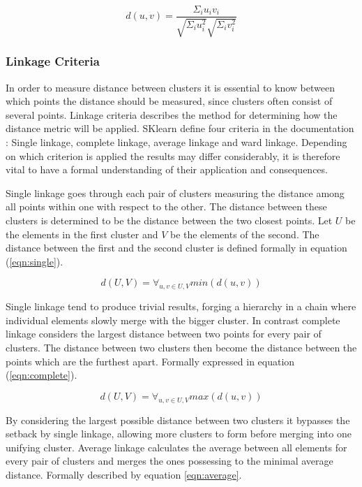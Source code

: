 \begin{equation}
\label{eqn:cosine}
d(u, v) = \frac{\Sigma_i u_iv_i}{\sqrt{\Sigma_i u_i^2}\sqrt{\Sigma_i v_i^2}}
\end{equation}

\subsubsection{Linkage Criteria}
In order to measure distance between clusters it is essential to know between which points the distance should be measured, since clusters often consist of several points. Linkage criteria describes the method for determining how the distance metric will be applied. SKlearn define four criteria in the documentation \cite{scikit}: Single linkage, complete linkage, average linkage and ward linkage. Depending on which criterion is applied the results may differ considerably, it is therefore vital to have a formal understanding of their application and consequences.

Single linkage goes through each pair of clusters measuring the distance among all points within one with respect to the other. The distance between these clusters is determined to be the distance between the two closest points. Let $U$ be the elements in the first cluster and $V$ be the elements of the second. The distance between the first and the second cluster is defined formally in equation (\ref{eqn:single}).

\begin{equation}
\label{eqn:single}
d(U, V) = \forall_{u, v \in U, V} min(d(u, v))
\end{equation}

Single linkage tend to produce trivial results, forging a hierarchy in a chain where individual elements slowly merge with the bigger cluster. In contrast complete linkage considers the largest distance between two points for every pair of clusters. The distance between two clusters then become the distance between the points which are the furthest apart. Formally expressed in equation (\ref{eqn:complete}).

\begin{equation}
\label{eqn:complete}
d(U, V) = \forall_{u, v \in U, V} max(d(u, v))
\end{equation}

By considering the largest possible distance between two clusters it bypasses the setback by single linkage, allowing more clusters to form before merging into one unifying cluster. Average linkage calculates the average between all elements for every pair of clusters and merges the ones possessing to the minimal average distance. Formally described by equation \ref{eqn:average}.

